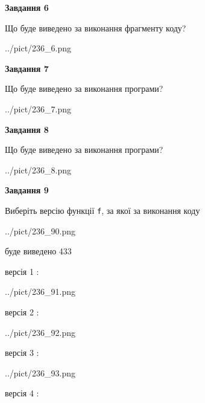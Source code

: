 \documentclass[12pt, ukrainian]{article}
\def\code#1{\Verb!#1!}
\begin{document}
{\begin {large}
{\begin {center}\textbf{Завдання 6}\end {center}}

Що буде виведено за виконання фрагменту коду?\par
\begin{center}
	{../pict/236_6.png}
\end{center}
\newpage

{\begin {center}\textbf{Завдання 7}\end {center}}

Що буде виведено за виконання програми?\par
\begin{center}
	{../pict/236_7.png}
\end{center}
\newpage

{\begin {center}\textbf{Завдання 8}\end {center}}

Що буде виведено за виконання програми?\par
\begin{center}
	{../pict/236_8.png}
\end{center}
\newpage

{\begin {center}\textbf{Завдання 9}\end {center}}

Виберіть версію функції \code{f}, за якої за виконання коду
\begin{center}
	{../pict/236_90.png}
\end{center}
буде виведено 433

\vspace{5mm}
версія 1 :

\begin{center}
	{../pict/236_91.png}
\end{center}
версія 2 :

\begin{center}
	{../pict/236_92.png}
\end{center}
версія 3 :

\begin{center}
	{../pict/236_93.png}
\end{center}
версія 4 :


\end{large}}
\end{document}
